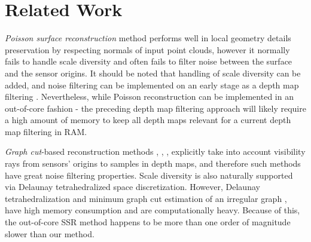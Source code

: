 \documentclass[10pt,twocolumn,letterpaper]{article}
\begin{document}
\section{Related Work}



\textit{Poisson surface reconstruction} method \cite{kazhdan2006poisson} performs well in local geometry details preservation by respecting normals of input point clouds, however it normally fails to handle scale diversity and often fails to filter noise between the surface and the sensor origins.
It should be noted that handling of scale diversity can be added, and noise filtering can be implemented on an early stage as a depth map filtering \cite{merrell2007real}. Nevertheless,
while Poisson reconstruction can be implemented in an out-of-core fashion \cite{bolitho2007multilevel} -
the preceding depth map filtering approach will likely require a high amount of memory to keep all depth maps relevant for a current depth map filtering in RAM.

\textit{Graph cut}-based reconstruction methods \cite{hiep2009towards}, \cite{jancosek2014exploiting}, \cite{han2019scalable}, \cite{zhou2019detail}
explicitly take into account visibility rays from sensors' origins to samples in depth maps, and therefore such methods have great noise filtering properties.
Scale diversity is also naturally supported via Delaunay tetrahedralized space discretization.
However, Delaunay tetrahedralization and minimum graph cut estimation of an irregular graph \cite{boykov2004experimental}, \cite{goldberg2015faster}
have high memory consumption and are computationally heavy. Because of this,
the out-of-core SSR \cite{mostegel2017scalable} method happens to be more than one order of magnitude slower than our method.
\end{document}
